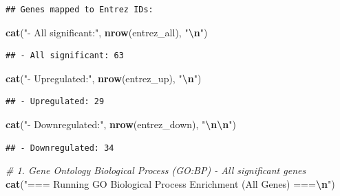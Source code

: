 \documentclass[
]{article}
\newenvironment{Shaded}{\begin{snugshade}}{\end{snugshade}}
\newcommand{\CommentTok}[1]{\textcolor[rgb]{0.56,0.35,0.01}{\textit{#1}}}
\newcommand{\FunctionTok}[1]{\textcolor[rgb]{0.13,0.29,0.53}{\textbf{#1}}}
\newcommand{\NormalTok}[1]{#1}
\newcommand{\SpecialCharTok}[1]{\textcolor[rgb]{0.81,0.36,0.00}{\textbf{#1}}}
\newcommand{\StringTok}[1]{\textcolor[rgb]{0.31,0.60,0.02}{#1}}
\begin{document}
\begin{verbatim}
## Genes mapped to Entrez IDs:
\end{verbatim}

\begin{Shaded}
\begin{Highlighting}[]
\FunctionTok{cat}\NormalTok{(}\StringTok{"{-} All significant:"}\NormalTok{, }\FunctionTok{nrow}\NormalTok{(entrez\_all), }\StringTok{"}\SpecialCharTok{\textbackslash{}n}\StringTok{"}\NormalTok{)}
\end{Highlighting}
\end{Shaded}

\begin{verbatim}
## - All significant: 63
\end{verbatim}

\begin{Shaded}
\begin{Highlighting}[]
\FunctionTok{cat}\NormalTok{(}\StringTok{"{-} Upregulated:"}\NormalTok{, }\FunctionTok{nrow}\NormalTok{(entrez\_up), }\StringTok{"}\SpecialCharTok{\textbackslash{}n}\StringTok{"}\NormalTok{) }
\end{Highlighting}
\end{Shaded}

\begin{verbatim}
## - Upregulated: 29
\end{verbatim}

\begin{Shaded}
\begin{Highlighting}[]
\FunctionTok{cat}\NormalTok{(}\StringTok{"{-} Downregulated:"}\NormalTok{, }\FunctionTok{nrow}\NormalTok{(entrez\_down), }\StringTok{"}\SpecialCharTok{\textbackslash{}n\textbackslash{}n}\StringTok{"}\NormalTok{)}
\end{Highlighting}
\end{Shaded}

\begin{verbatim}
## - Downregulated: 34
\end{verbatim}

\begin{Shaded}
\begin{Highlighting}[]
\CommentTok{\# 1. Gene Ontology Biological Process (GO:BP) {-} All significant genes}
\FunctionTok{cat}\NormalTok{(}\StringTok{"=== Running GO Biological Process Enrichment (All Genes) ===}\SpecialCharTok{\textbackslash{}n}\StringTok{"}\NormalTok{)}
\end{Highlighting}
\end{Shaded}
\end{document}
